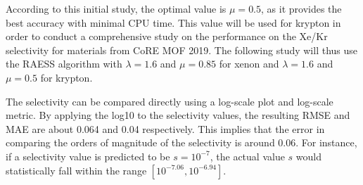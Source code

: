 \documentclass[main]{subfiles}
\begin{document}
According to this initial study, the optimal value is $\mu=0.5$, as it provides the best accuracy with minimal CPU time. This value will be used for krypton in order to conduct a comprehensive study on the performance on the Xe/Kr selectivity for materials from CoRE MOF 2019. The following study will thus use the RAESS algorithm with $\lambda=1.6$ and $\mu=0.85$ for xenon and $\lambda=1.6$ and $\mu=0.5$ for krypton.

The selectivity can be compared directly using a log-scale plot and log-scale metric. By applying the log10 to the selectivity values, the resulting RMSE and MAE are about 0.064 and 0.04 respectively. This implies that the error in comparing the orders of magnitude of the selectivity is around 0.06. For instance, if a selectivity value is predicted to be $s = 10^{-7}$, the actual value $s$ would statistically fall within the range $[10^{-7.06},10^{-6.94}]$.
\end{document}
